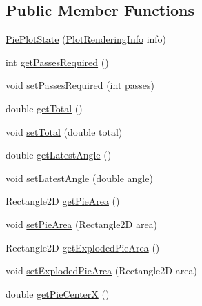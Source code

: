\subsection*{Public Member Functions}
\begin{DoxyCompactItemize}
\item 
\mbox{\hyperlink{classorg_1_1jfree_1_1chart_1_1plot_1_1_pie_plot_state_a4977e2c8991281a9dd2a387b5b90e938}{Pie\+Plot\+State}} (\mbox{\hyperlink{classorg_1_1jfree_1_1chart_1_1plot_1_1_plot_rendering_info}{Plot\+Rendering\+Info}} info)
\item 
int \mbox{\hyperlink{classorg_1_1jfree_1_1chart_1_1plot_1_1_pie_plot_state_a1c42afe172e40f3d0a485dd00c993fe1}{get\+Passes\+Required}} ()
\item 
void \mbox{\hyperlink{classorg_1_1jfree_1_1chart_1_1plot_1_1_pie_plot_state_a4cf861bf64d679022c2853f6909af1ad}{set\+Passes\+Required}} (int passes)
\item 
double \mbox{\hyperlink{classorg_1_1jfree_1_1chart_1_1plot_1_1_pie_plot_state_adfd904fd80acd6ee192f738f712b5ffa}{get\+Total}} ()
\item 
void \mbox{\hyperlink{classorg_1_1jfree_1_1chart_1_1plot_1_1_pie_plot_state_a6ad715e7be012a050e7fd6e3704f510f}{set\+Total}} (double total)
\item 
double \mbox{\hyperlink{classorg_1_1jfree_1_1chart_1_1plot_1_1_pie_plot_state_aa10b2c59eadd60272431f307bc9a8649}{get\+Latest\+Angle}} ()
\item 
void \mbox{\hyperlink{classorg_1_1jfree_1_1chart_1_1plot_1_1_pie_plot_state_aaad10747e8ee73967666e58d35ec6e6b}{set\+Latest\+Angle}} (double angle)
\item 
Rectangle2D \mbox{\hyperlink{classorg_1_1jfree_1_1chart_1_1plot_1_1_pie_plot_state_ad2837cd523c5134f5184b11bc818d5e2}{get\+Pie\+Area}} ()
\item 
void \mbox{\hyperlink{classorg_1_1jfree_1_1chart_1_1plot_1_1_pie_plot_state_ae1f368310b1984da5c0d84eeb7d2fad4}{set\+Pie\+Area}} (Rectangle2D area)
\item 
Rectangle2D \mbox{\hyperlink{classorg_1_1jfree_1_1chart_1_1plot_1_1_pie_plot_state_a755d8f671b62c6db7414e87c7308b457}{get\+Exploded\+Pie\+Area}} ()
\item 
void \mbox{\hyperlink{classorg_1_1jfree_1_1chart_1_1plot_1_1_pie_plot_state_a831a22430ac5eedaac8da92c19b1c996}{set\+Exploded\+Pie\+Area}} (Rectangle2D area)
\item 
double \mbox{\hyperlink{classorg_1_1jfree_1_1chart_1_1plot_1_1_pie_plot_state_af99e498f7bfe34f88c9082d73c0844fd}{get\+Pie\+CenterX}} ()

\end{DoxyCompactItemize}
